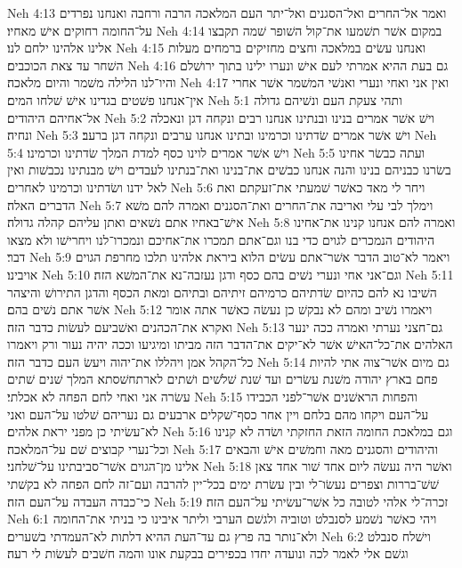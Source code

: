 Neh 4:13  ואמר אל־החרים ואל־הסגנים ואל־יתר העם המלאכה הרבה ורחבה ואנחנו נפרדים על־החומה רחוקים אישׁ מאחיו׃
Neh 4:14  במקום אשׁר תשׁמעו את־קול השׁופר שׁמה תקבצו אלינו אלהינו ילחם לנו׃
Neh 4:15  ואנחנו עשׂים במלאכה וחצים מחזיקים ברמחים מעלות השׁחר עד צאת הכוכבים׃
Neh 4:16  גם בעת ההיא אמרתי לעם אישׁ ונערו ילינו בתוך ירושׁלם והיו־לנו הלילה משׁמר והיום מלאכה׃
Neh 4:17  ואין אני ואחי ונערי ואנשׁי המשׁמר אשׁר אחרי אין־אנחנו פשׁטים בגדינו אישׁ שׁלחו המים׃
Neh 5:1  ותהי צעקת העם ונשׁיהם גדולה אל־אחיהם היהודים׃
Neh 5:2  וישׁ אשׁר אמרים בנינו ובנתינו אנחנו רבים ונקחה דגן ונאכלה ונחיה׃
Neh 5:3  וישׁ אשׁר אמרים שׂדתינו וכרמינו ובתינו אנחנו ערבים ונקחה דגן ברעב׃
Neh 5:4  וישׁ אשׁר אמרים לוינו כסף למדת המלך שׂדתינו וכרמינו׃
Neh 5:5  ועתה כבשׂר אחינו בשׂרנו כבניהם בנינו והנה אנחנו כבשׁים את־בנינו ואת־בנתינו לעבדים וישׁ מבנתינו נכבשׁות ואין לאל ידנו ושׂדתינו וכרמינו לאחרים׃
Neh 5:6  ויחר לי מאד כאשׁר שׁמעתי את־זעקתם ואת הדברים האלה׃
Neh 5:7  וימלך לבי עלי ואריבה את־החרים ואת־הסגנים ואמרה להם משׁא אישׁ־באחיו אתם נשׁאים ואתן עליהם קהלה גדולה׃
Neh 5:8  ואמרה להם אנחנו קנינו את־אחינו היהודים הנמכרים לגוים כדי בנו וגם־אתם תמכרו את־אחיכם ונמכרו־לנו ויחרישׁו ולא מצאו דבר׃
Neh 5:9  ויאמר לא־טוב הדבר אשׁר־אתם עשׂים הלוא ביראת אלהינו תלכו מחרפת הגוים אויבינו׃
Neh 5:10  וגם־אני אחי ונערי נשׁים בהם כסף ודגן נעזבה־נא את־המשׁא הזה׃
Neh 5:11  השׁיבו נא להם כהיום שׂדתיהם כרמיהם זיתיהם ובתיהם ומאת הכסף והדגן התירושׁ והיצהר אשׁר אתם נשׁים בהם׃
Neh 5:12  ויאמרו נשׁיב ומהם לא נבקשׁ כן נעשׂה כאשׁר אתה אומר ואקרא את־הכהנים ואשׁביעם לעשׂות כדבר הזה׃
Neh 5:13  גם־חצני נערתי ואמרה ככה ינער האלהים את־כל־האישׁ אשׁר לא־יקים את־הדבר הזה מביתו ומיגיעו וככה יהיה נעור ורק ויאמרו כל־הקהל אמן ויהללו את־יהוה ויעשׂ העם כדבר הזה׃
Neh 5:14  גם מיום אשׁר־צוה אתי להיות פחם בארץ יהודה משׁנת עשׂרים ועד שׁנת שׁלשׁים ושׁתים לארתחשׁסתא המלך שׁנים שׁתים עשׂרה אני ואחי לחם הפחה לא אכלתי׃
Neh 5:15  והפחות הראשׁנים אשׁר־לפני הכבידו על־העם ויקחו מהם בלחם ויין אחר כסף־שׁקלים ארבעים גם נעריהם שׁלטו על־העם ואני לא־עשׂיתי כן מפני יראת אלהים׃
Neh 5:16  וגם במלאכת החומה הזאת החזקתי ושׂדה לא קנינו וכל־נערי קבוצים שׁם על־המלאכה׃
Neh 5:17  והיהודים והסגנים מאה וחמשׁים אישׁ והבאים אלינו מן־הגוים אשׁר־סביבתינו על־שׁלחני׃
Neh 5:18  ואשׁר היה נעשׂה ליום אחד שׁור אחד צאן שׁשׁ־בררות וצפרים נעשׂו־לי ובין עשׂרת ימים בכל־יין להרבה ועם־זה לחם הפחה לא בקשׁתי כי־כבדה העבדה על־העם הזה׃
Neh 5:19  זכרה־לי אלהי לטובה כל אשׁר־עשׂיתי על־העם הזה׃
Neh 6:1  ויהי כאשׁר נשׁמע לסנבלט וטוביה ולגשׁם הערבי וליתר איבינו כי בניתי את־החומה ולא־נותר בה פרץ גם עד־העת ההיא דלתות לא־העמדתי בשׁערים׃
Neh 6:2  וישׁלח סנבלט וגשׁם אלי לאמר לכה ונועדה יחדו בכפירים בבקעת אונו והמה חשׁבים לעשׂות לי רעה׃
